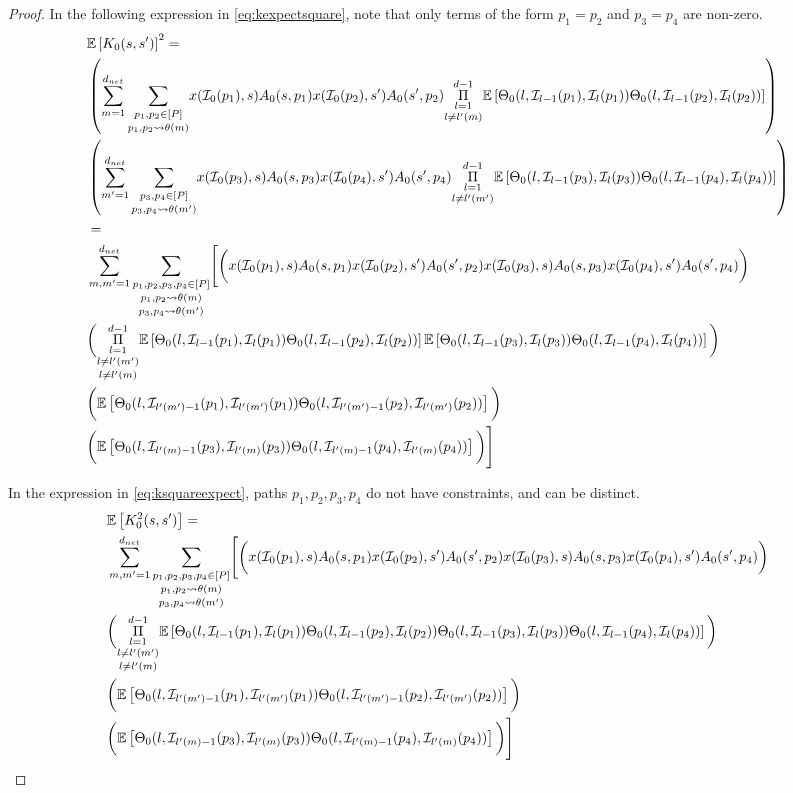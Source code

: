\begin{proof}
In the following expression in \eqref{eq:kexpectsquare}, note that only terms of the form $p_1=p_2$ and $p_3=p_4$ are non-zero.
\begin{align}\label{eq:kexpectsquare}
&\mathbb{E}\left[K_0(s,s')\right]^2=\nonumber\\
&\left(\sum_{m=1}^{d_{net}}\underset{p_1,p_2\rightsquigarrow\theta(m)}{\sum_{p_1,p_2\in[P]}}x(\mathcal{I}_0(p_1),s)A_0(s,p_1)x(\mathcal{I}_0(p_2),s')A_0(s',p_2) \underset{l\neq l'(m)}{\underset{l=1}{\overset{d-1}{\Pi}}} \mathbb{E}\left[{\Theta}_0(l,\mathcal{I}_{l-1}(p_1),\mathcal{I}_{l}(p_1)) {\Theta}_0(l,\mathcal{I}_{l-1}(p_2),\mathcal{I}_{l}(p_2))\right]\right)\nonumber\\
&\left(\sum_{m'=1}^{d_{net}}\underset{p_3,p_4\rightsquigarrow\theta(m')}{\sum_{p_3,p_4\in[P]}}x(\mathcal{I}_0(p_3),s)A_0(s,p_3)x(\mathcal{I}_0(p_4),s')A_0(s',p_4) \underset{l\neq l'(m')}{\underset{l=1}{\overset{d-1}{\Pi}}} \mathbb{E}\left[{\Theta}_0(l,\mathcal{I}_{l-1}(p_3),\mathcal{I}_{l}(p_3)) {\Theta}_0(l,\mathcal{I}_{l-1}(p_4),\mathcal{I}_{l}(p_4))\right]\right)\nonumber\\
&=\nonumber\\
&\sum_{m,m'=1}^{d_{net}}\underset{p_3,p_4\rightsquigarrow\theta(m')}{\underset{p_1,p_2\rightsquigarrow\theta(m)}{\sum_{p_1,p_2,p_3,p_4\in[P]}}}\Bigg[\bigg(x(\mathcal{I}_0(p_1),s)A_0(s,p_1)x(\mathcal{I}_0(p_2),s')A_0(s',p_2)x(\mathcal{I}_0(p_3),s)A_0(s,p_3)x(\mathcal{I}_0(p_4),s')A_0(s',p_4)\bigg)\nonumber\\
&\bigg( \underset{l\neq l'(m)} {\underset{l\neq l'(m')}{\underset{l=1}{\overset{d-1}{\Pi}}}} \mathbb{E}\left[{\Theta}_0(l,\mathcal{I}_{l-1}(p_1),\mathcal{I}_{l}(p_1)) {\Theta}_0(l,\mathcal{I}_{l-1}(p_2),\mathcal{I}_{l}(p_2))\right]\mathbb{E}\left[{\Theta}_0(l,\mathcal{I}_{l-1}(p_3),\mathcal{I}_{l}(p_3)) {\Theta}_0(l,\mathcal{I}_{l-1}(p_4),\mathcal{I}_{l}(p_4))\right] \bigg)\nonumber\\
&\bigg( \mathbb{E}\left[{\Theta}_0(l,\mathcal{I}_{l'(m')-1}(p_1),\mathcal{I}_{l'(m')}(p_1)) {\Theta}_0(l,\mathcal{I}_{l'(m')-1}(p_2),\mathcal{I}_{l'(m')}(p_2))\right]\bigg)\nonumber\\
&\bigg(\mathbb{E}\left[{\Theta}_0(l,\mathcal{I}_{l'(m)-1}(p_3),\mathcal{I}_{l'(m)}(p_3)) {\Theta}_0(l,\mathcal{I}_{l'(m)-1}(p_4),\mathcal{I}_{l'(m)}(p_4))\right] \bigg)\Bigg]\nonumber\\
\end{align}

In the expression in \eqref{eq:ksquareexpect}, paths $p_1,p_2,p_3,p_4$ do not have constraints, and can be distinct.
\begin{align}\label{eq:ksquareexpect}
&\mathbb{E}\left[K^2_0(s,s')\right]=\nonumber\\
&\sum_{m,m'=1}^{d_{net}}\underset{p_3,p_4\rightsquigarrow\theta(m')}{\underset{p_1,p_2\rightsquigarrow\theta(m)}{\sum_{p_1,p_2,p_3,p_4\in[P]}}}\Bigg[\bigg(x(\mathcal{I}_0(p_1),s)A_0(s,p_1)x(\mathcal{I}_0(p_2),s')A_0(s',p_2)x(\mathcal{I}_0(p_3),s)A_0(s,p_3)x(\mathcal{I}_0(p_4),s')A_0(s',p_4)\bigg)\nonumber\\
&\bigg( \underset{l\neq l'(m)} {\underset{l\neq l'(m')}{\underset{l=1}{\overset{d-1}{\Pi}}}} \mathbb{E}\left[{\Theta}_0(l,\mathcal{I}_{l-1}(p_1),\mathcal{I}_{l}(p_1)) {\Theta}_0(l,\mathcal{I}_{l-1}(p_2),\mathcal{I}_{l}(p_2)){\Theta}_0(l,\mathcal{I}_{l-1}(p_3),\mathcal{I}_{l}(p_3)) {\Theta}_0(l,\mathcal{I}_{l-1}(p_4),\mathcal{I}_{l}(p_4))\right] \bigg)\nonumber\\
&\bigg( \mathbb{E}\left[{\Theta}_0(l,\mathcal{I}_{l'(m')-1}(p_1),\mathcal{I}_{l'(m')}(p_1)) {\Theta}_0(l,\mathcal{I}_{l'(m')-1}(p_2),\mathcal{I}_{l'(m')}(p_2))\right]\bigg)\nonumber\\
&\bigg(\mathbb{E}\left[{\Theta}_0(l,\mathcal{I}_{l'(m)-1}(p_3),\mathcal{I}_{l'(m)}(p_3)) {\Theta}_0(l,\mathcal{I}_{l'(m)-1}(p_4),\mathcal{I}_{l'(m)}(p_4))\right] \bigg)\Bigg]\nonumber\\
\end{align}


\end{proof}
